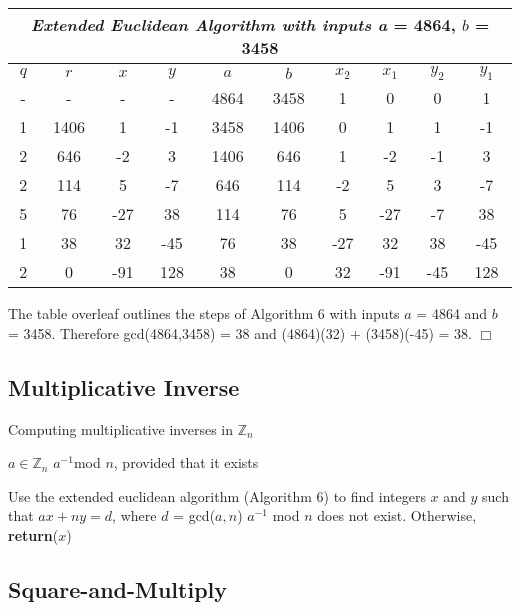 \documentclass[iwp,first]{luthesis}
\begin{document}
\begin{center}
\begin{tabular}{|c|c|c|c|c|c|c|c|c|c|}
\hline
\multicolumn{10}{|c|}{\textit{Extended Euclidean Algorithm with inputs a} = 4864, $b$ = 3458}\\
\hline
$q$ & $r$ & $x$ & $y$ & $a$ & $b$ & $x_{2}$ & $x_{1}$ & $y_{2}$ & $y_{1}$ \\ \hline\hline
- & - & - & - & 4864 & 3458 & 1 & 0 & 0 & 1 \\ 
1 & 1406 & 1 & -1 & 3458 & 1406 & 0 & 1 & 1 & -1 \\ 
2 & 646 & -2 & 3 & 1406 & 646 & 1 & -2 & -1 & 3 \\ 
2 & 114 & 5 & -7 & 646 & 114 & -2 & 5 & 3 & -7 \\ 
5 & 76 & -27 & 38 & 114 & 76 & 5 & -27 & -7 & 38 \\ 
1 & 38 & 32 & -45 & 76 & 38 & -27 & 32 & 38 & -45 \\ 
2 & 0 & -91 & 128 & 38 & 0 & 32 & -91 & -45 & 128 \\ 
\hline
\end{tabular}
\end{center}

The table overleaf outlines the steps of Algorithm 6 with inputs $a$ = 4864 and $b$ = 3458. Therefore gcd(4864,3458) = 38 and (4864)(32) + (3458)(-45) = 38.
\hfill $\Box$

\subsection{Multiplicative Inverse}

\begin{algorithm}
\caption{Computing multiplicative inverses in $\mathbb{Z}_n$}
\begin{algorithmic}
\REQUIRE $a \in \mathbb{Z}_n$
\ENSURE $a^{-1}$mod $n$, provided that it exists
\begin{enumerate}
\STATE Use the extended euclidean algorithm (Algorithm 6) to find integers $x$ and $y$ such that $ax + ny = d$, where $d$ = gcd($a, n$)
\STATE $a^{-1}$ mod $n$ does not exist. Otherwise, \textbf{return}($x$)
\ENDIF
\end{enumerate}
\end{algorithmic}
\end{algorithm}

\subsection{Square-and-Multiply}
\end{document}
